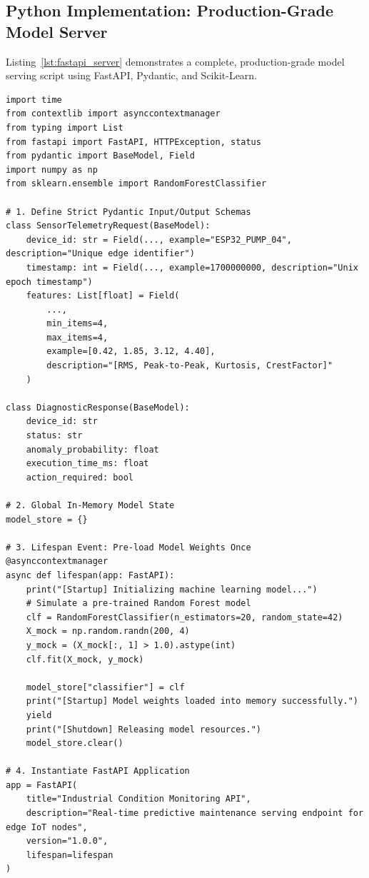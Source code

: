 \subsection{Python Implementation: Production-Grade Model Server}\label{subsec:fastapi_code}

Listing~\ref{lst:fastapi_server} demonstrates a complete, production-grade model serving script using FastAPI, Pydantic, and Scikit-Learn.

\begin{lstlisting}[style=pythonstyle, caption={Complete FastAPI model serving application with Pydantic validation.}, label={lst:fastapi_server}]
import time
from contextlib import asynccontextmanager
from typing import List
from fastapi import FastAPI, HTTPException, status
from pydantic import BaseModel, Field
import numpy as np
from sklearn.ensemble import RandomForestClassifier

# 1. Define Strict Pydantic Input/Output Schemas
class SensorTelemetryRequest(BaseModel):
    device_id: str = Field(..., example="ESP32_PUMP_04", description="Unique edge identifier")
    timestamp: int = Field(..., example=1700000000, description="Unix epoch timestamp")
    features: List[float] = Field(
        ..., 
        min_items=4, 
        max_items=4, 
        example=[0.42, 1.85, 3.12, 4.40],
        description="[RMS, Peak-to-Peak, Kurtosis, CrestFactor]"
    )

class DiagnosticResponse(BaseModel):
    device_id: str
    status: str
    anomaly_probability: float
    execution_time_ms: float
    action_required: bool

# 2. Global In-Memory Model State
model_store = {}

# 3. Lifespan Event: Pre-load Model Weights Once
@asynccontextmanager
async def lifespan(app: FastAPI):
    print("[Startup] Initializing machine learning model...")
    # Simulate a pre-trained Random Forest model
    clf = RandomForestClassifier(n_estimators=20, random_state=42)
    X_mock = np.random.randn(200, 4)
    y_mock = (X_mock[:, 1] > 1.0).astype(int)
    clf.fit(X_mock, y_mock)
    
    model_store["classifier"] = clf
    print("[Startup] Model weights loaded into memory successfully.")
    yield
    print("[Shutdown] Releasing model resources.")
    model_store.clear()

# 4. Instantiate FastAPI Application
app = FastAPI(
    title="Industrial Condition Monitoring API",
    description="Real-time predictive maintenance serving endpoint for edge IoT nodes",
    version="1.0.0",
    lifespan=lifespan
)


\end{lstlisting}
